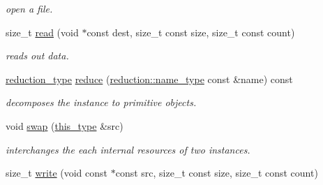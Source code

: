 \begin{DoxyCompactItemize}
\begin{DoxyCompactList}\small\item\em open a file. \end{DoxyCompactList}\item 
\hypertarget{classhryky_1_1file_1_1descriptor_1_1_entity_aabddfac8f6f1232ba571f9dbf7fb174b}{size\-\_\-t \hyperlink{classhryky_1_1file_1_1descriptor_1_1_entity_aabddfac8f6f1232ba571f9dbf7fb174b}{read} (void $\ast$const dest, size\-\_\-t const size, size\-\_\-t const count)}\label{classhryky_1_1file_1_1descriptor_1_1_entity_aabddfac8f6f1232ba571f9dbf7fb174b}

\begin{DoxyCompactList}\small\item\em reads out data. \end{DoxyCompactList}\item 
\hypertarget{classhryky_1_1file_1_1descriptor_1_1_entity_af9f878bed219149b17981eb68d8fab33}{\hyperlink{namespacehryky_a343a9a4c36a586be5c2693156200eadc}{reduction\-\_\-type} \hyperlink{classhryky_1_1file_1_1descriptor_1_1_entity_af9f878bed219149b17981eb68d8fab33}{reduce} (\hyperlink{namespacehryky_1_1reduction_ac686c30a4c8d196bbd0f05629a6b921f}{reduction\-::name\-\_\-type} const \&name) const }\label{classhryky_1_1file_1_1descriptor_1_1_entity_af9f878bed219149b17981eb68d8fab33}

\begin{DoxyCompactList}\small\item\em decomposes the instance to primitive objects. \end{DoxyCompactList}\item 
\hypertarget{classhryky_1_1file_1_1descriptor_1_1_entity_ab6612fb16ad38142c57e6cc86782ffcb}{void \hyperlink{classhryky_1_1file_1_1descriptor_1_1_entity_ab6612fb16ad38142c57e6cc86782ffcb}{swap} (\hyperlink{classhryky_1_1file_1_1descriptor_1_1_entity_aeddd6b16ed286888bba1c419eee51d6c}{this\-\_\-type} \&src)}\label{classhryky_1_1file_1_1descriptor_1_1_entity_ab6612fb16ad38142c57e6cc86782ffcb}

\begin{DoxyCompactList}\small\item\em interchanges the each internal resources of two instances. \end{DoxyCompactList}\item 
\hypertarget{classhryky_1_1file_1_1descriptor_1_1_entity_ae20091f968d3df2ef8e3680a085bf4b5}{size\-\_\-t \hyperlink{classhryky_1_1file_1_1descriptor_1_1_entity_ae20091f968d3df2ef8e3680a085bf4b5}{write} (void const $\ast$const src, size\-\_\-t const size, size\-\_\-t const count)}\label{classhryky_1_1file_1_1descriptor_1_1_entity_ae20091f968d3df2ef8e3680a085bf4b5}


\end{DoxyCompactItemize}

